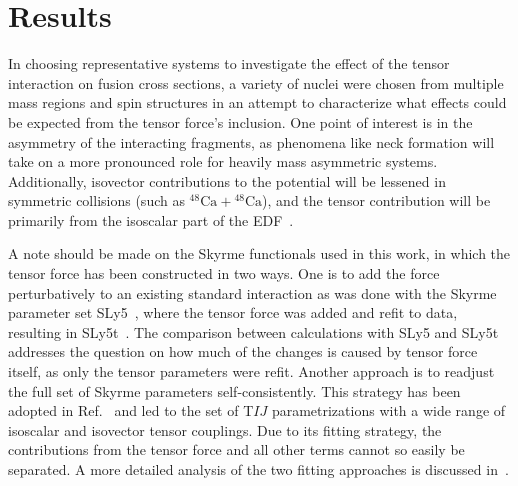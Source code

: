 \section{Results}
\label{results}


In choosing representative systems to investigate the effect of the tensor interaction on fusion cross sections, a variety of nuclei were chosen from multiple mass regions and spin structures in an attempt to characterize what effects could be expected from the tensor force's inclusion.
One point of interest is in the asymmetry of the interacting fragments, as phenomena like neck formation will take on a more pronounced role for heavily mass asymmetric systems.
Additionally, isovector contributions to the potential will be lessened in symmetric collisions (such as $^{48}\mathrm{Ca}+\mathrm{^{48}Ca}$), and the tensor contribution will be primarily from the isoscalar part of the EDF~\citep{godbey2017}.

A note should be made on the Skyrme functionals used in this work, in which the tensor force has been constructed in two ways.
One is to add the force perturbatively to an existing standard interaction as was done with the Skyrme parameter set SLy5~\citep{chabanat1998a}, where the tensor force was added and refit to data, resulting in SLy5t~\citep{colo2007}.
The comparison between calculations with SLy5 and SLy5t addresses the question on how much of the changes is caused by tensor force itself, as only the tensor parameters were refit.
Another approach is to readjust the full set of Skyrme parameters self-consistently.
This strategy has been adopted in Ref.~\citep{lesinski2007} and led to the set of T$IJ$ parametrizations with a wide range of isoscalar and isovector tensor couplings.
Due to its fitting strategy, the contributions from the tensor force and all other terms cannot so easily be separated.
A more detailed analysis of the two fitting approaches is discussed in~\citep{stevenson2019}.

